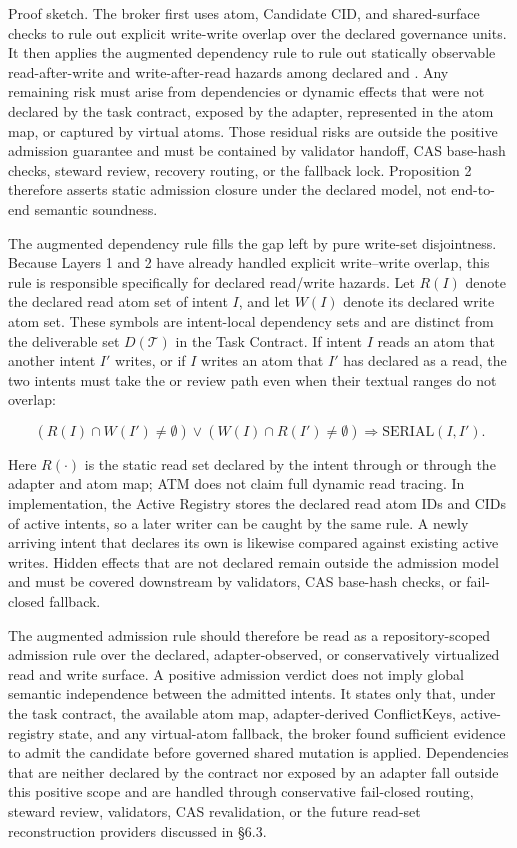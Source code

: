 \documentclass[9pt,letterpaper]{extarticle}
\begin{document}
Proof sketch. The broker first uses atom, Candidate CID, and shared-surface checks to rule out explicit write-write overlap over the declared governance units. It then applies the augmented dependency rule to rule out statically observable read-after-write and write-after-read hazards among declared \texttt{} and \texttt{}. Any remaining risk must arise from dependencies or dynamic effects that were not declared by the task contract, exposed by the adapter, represented in the atom map, or captured by virtual atoms. Those residual risks are outside the positive admission guarantee and must be contained by validator handoff, CAS base-hash checks, steward review, recovery routing, or the fallback lock. Proposition 2 therefore asserts static admission closure under the declared model, not end-to-end semantic soundness.

The augmented dependency rule fills the gap left by pure write-set disjointness. Because Layers 1 and 2 have already handled explicit write--write overlap, this rule is responsible specifically for declared read/write hazards. Let $R(I)$ denote the declared read atom set of intent $I$, and let $W(I)$ denote its declared write atom set. These symbols are intent-local dependency sets and are distinct from the deliverable set $D(\mathcal{T})$ in the Task Contract. If intent $I$ reads an atom that another intent $I'$ writes, or if $I$ writes an atom that $I'$ has declared as a read, the two intents must take the \texttt{} or review path even when their textual ranges do not overlap:

\[
(R(I) \cap W(I') \neq \emptyset)
\lor
(W(I) \cap R(I') \neq \emptyset)
\Rightarrow
\mathrm{SERIAL}(I, I').
\]

Here $R(\cdot)$ is the static read set declared by the intent through \texttt{} or through the adapter and atom map; ATM does not claim full dynamic read tracing. In implementation, the Active Registry stores the declared read atom IDs and CIDs of active intents, so a later writer can be caught by the same rule. A newly arriving intent that declares its own \texttt{} is likewise compared against existing active writes. Hidden effects that are not declared remain outside the admission model and must be covered downstream by validators, CAS base-hash checks, or fail-closed fallback.

The augmented admission rule should therefore be read as a repository-scoped admission rule over the declared, adapter-observed, or conservatively virtualized read and write surface. A positive admission verdict does not imply global semantic independence between the admitted intents. It states only that, under the task contract, the available atom map, adapter-derived ConflictKeys, active-registry state, and any virtual-atom fallback, the broker found sufficient evidence to admit the candidate before governed shared mutation is applied. Dependencies that are neither declared by the contract nor exposed by an adapter fall outside this positive scope and are handled through conservative fail-closed routing, steward review, validators, CAS revalidation, or the future read-set reconstruction providers discussed in §6.3.
\end{document}
